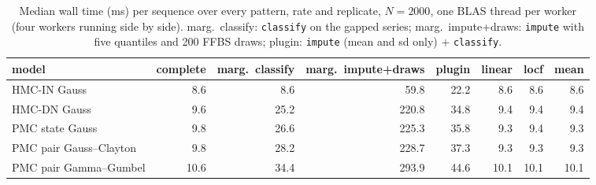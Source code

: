 \begin{table}[htbp]
  \centering
  \small
  \setlength{\tabcolsep}{4pt}
  \caption{Median wall time (ms) per sequence over every pattern, rate and replicate, $N = 2000$, one BLAS thread per worker (four workers running side by side). marg.\ classify: \texttt{classify} on the gapped series; marg.\ impute+draws: \texttt{impute} with five quantiles and 200 FFBS draws; plugin: \texttt{impute} (mean and sd only) + \texttt{classify}.}
  \label{tab:missing-timing}
  \begin{tabular}{lrrrrrrr}
    \toprule
    model & complete & marg.\ classify & marg.\ impute+draws & plugin & linear & locf & mean \\
    \midrule
    HMC-IN Gauss & 8.6 & 8.6 & 59.8 & 22.2 & 8.6 & 8.6 & 8.6 \\
    HMC-DN Gauss & 9.6 & 25.2 & 220.8 & 34.8 & 9.4 & 9.4 & 9.4 \\
    PMC state Gauss & 9.8 & 26.6 & 225.3 & 35.8 & 9.3 & 9.4 & 9.3 \\
    PMC pair Gauss--Clayton & 9.8 & 28.2 & 228.7 & 37.3 & 9.3 & 9.3 & 9.3 \\
    PMC pair Gamma--Gumbel & 10.6 & 34.4 & 293.9 & 44.6 & 10.1 & 10.1 & 10.1 \\
    \bottomrule
  \end{tabular}
\end{table}
